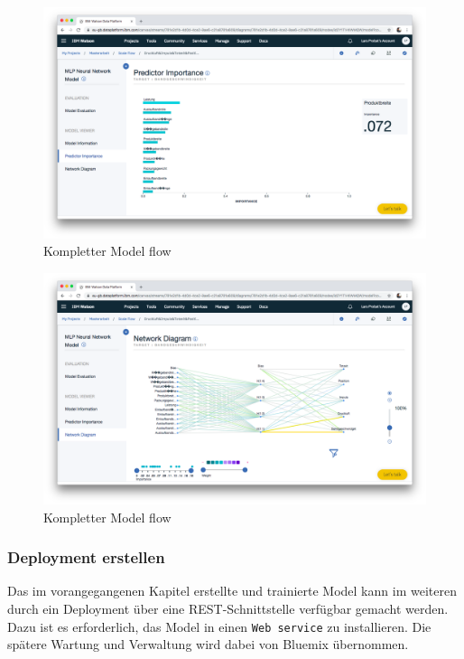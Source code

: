 \begin{figure}[h]
    \centering
    \includegraphics[scale=0.26]{images/kapitel_3/model_predictor.png}
    \caption{Kompletter Model flow}
    \label{fig:umsetzung_model_predictor}
\end{figure}

\begin{figure}[h]
    \centering
    \includegraphics[scale=0.26]{images/kapitel_3/model_network_diagram.png}
    \caption{Kompletter Model flow}
    \label{fig:umsetzung_model_network_diagram}
\end{figure}

\subsubsection{Deployment erstellen}
Das im vorangegangenen Kapitel erstellte und trainierte Model kann im weiteren durch ein Deployment über eine
REST-Schnittstelle verfügbar gemacht werden. Dazu ist es erforderlich, das Model in einen \texttt{Web service} zu
installieren. Die spätere Wartung und Verwaltung wird dabei von Bluemix übernommen.

